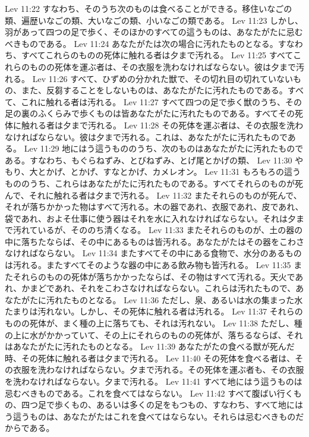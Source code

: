 Lev 11:22  すなわち、そのうち次のものは食べることができる。移住いなごの類、遍歴いなごの類、大いなごの類、小いなごの類である。
Lev 11:23  しかし、羽があって四つの足で歩く、そのほかのすべての這うものは、あなたがたに忌むべきものである。
Lev 11:24  あなたがたは次の場合に汚れたものとなる。すなわち、すべてこれらのものの死体に触れる者は夕まで汚れる。
Lev 11:25  すべてこれらのものの死体を運ぶ者は、その衣服を洗わなければならない。彼は夕まで汚れる。
Lev 11:26  すべて、ひずめの分かれた獣で、その切れ目の切れていないもの、また、反芻することをしないものは、あなたがたに汚れたものである。すべて、これに触れる者は汚れる。
Lev 11:27  すべて四つの足で歩く獣のうち、その足の裏のふくらみで歩くものは皆あなたがたに汚れたものである。すべてその死体に触れる者は夕まで汚れる。
Lev 11:28  その死体を運ぶ者は、その衣服を洗わなければならない。彼は夕まで汚れる。これは、あなたがたに汚れたものである。
Lev 11:29  地にはう這うもののうち、次のものはあなたがたに汚れたものである。すなわち、もぐらねずみ、とびねずみ、とげ尾とかげの類、
Lev 11:30  やもり、大とかげ、とかげ、すなとかげ、カメレオン。
Lev 11:31  もろもろの這うもののうち、これらはあなたがたに汚れたものである。すべてそれらのものが死んで、それに触れる者は夕まで汚れる。
Lev 11:32  またそれらのものが死んで、それが落ちかかった物はすべて汚れる。木の器であれ、衣服であれ、皮であれ、袋であれ、およそ仕事に使う器はそれを水に入れなければならない。それは夕まで汚れているが、そののち清くなる。
Lev 11:33  またそれらのものが、土の器の中に落ちたならば、その中にあるものは皆汚れる。あなたがたはその器をこわさなければならない。
Lev 11:34  またすべてその中にある食物で、水分のあるものは汚れる。またすべてそのような器の中にある飲み物も皆汚れる。
Lev 11:35  またそれらのものの死体が落ちかかったならば、その物はすべて汚れる。天火であれ、かまどであれ、それをこわさなければならない。これらは汚れたもので、あなたがたに汚れたものとなる。
Lev 11:36  ただし、泉、あるいは水の集まった水たまりは汚れない。しかし、その死体に触れる者は汚れる。
Lev 11:37  それらのものの死体が、まく種の上に落ちても、それは汚れない。
Lev 11:38  ただし、種の上に水がかかっていて、その上にそれらのものの死体が、落ちるならば、それはあなたがたに汚れたものとなる。
Lev 11:39  あなたがたの食べる獣が死んだ時、その死体に触れる者は夕まで汚れる。
Lev 11:40  その死体を食べる者は、その衣服を洗わなければならない。夕まで汚れる。その死体を運ぶ者も、その衣服を洗わなければならない。夕まで汚れる。
Lev 11:41  すべて地にはう這うものは忌むべきものである。これを食べてはならない。
Lev 11:42  すべて腹ばい行くもの、四つ足で歩くもの、あるいは多くの足をもつもの、すなわち、すべて地にはう這うものは、あなたがたはこれを食べてはならない。それらは忌むべきものだからである。
